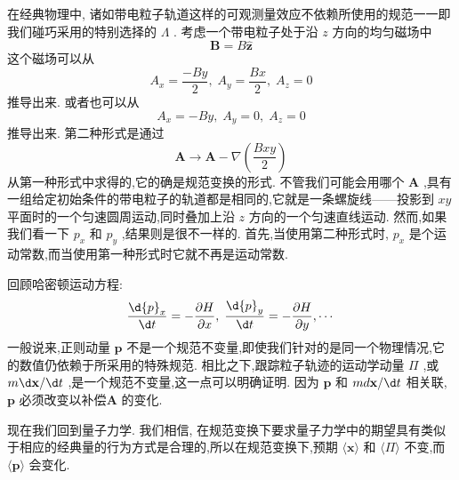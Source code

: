 在经典物理中, 诸如带电粒子轨道这样的可观测量效应不依赖所使用的规范一一即我们碰巧采用的特别选择的 $\Lambda$ . 考虑一个带电粒子处于沿 $z$ 方向的均匀磁场中
\begin{equation}
\mathbf{B} = B\widehat{\mathbf{z}}
\end{equation}
这个磁场可以从
\begin{equation}
{A}_{x} = \frac{-{By}}{2},\;{A}_{y} = \frac{Bx}{2},\;{A}_{z} = 0
\end{equation}
推导出来. 或者也可以从
\begin{equation}
{A}_{x} = - {By},\;{A}_{y} = 0,\;{A}_{z} = 0
\end{equation}
推导出来. 第二种形式是通过
\begin{equation}
\mathbf{A} \rightarrow \mathbf{A} - \nabla \left( \frac{Bxy}{2}\right)
\end{equation}
从第一种形式中求得的,它的确是规范变换的形式. 不管我们可能会用哪个 $\mathbf{A}$ ,具有一组给定初始条件的带电粒子的轨道都是相同的,它就是一条螺旋线——投影到 ${xy}$ 平面时的一个匀速圆周运动,同时叠加上沿 $z$ 方向的一个匀速直线运动. 然而,如果我们看一下 ${p}_{x}$ 和 ${p}_{y}$ ,结果则是很不一样的. 首先,当使用第二种形式时, ${p}_{x}$ 是个运动常数,而当使用第一种形式时它就不再是运动常数.

回顾哈密顿运动方程:
\begin{equation}
\frac{\d {p}_{x}}{\d t} = - \frac{\partial H}{\partial x},\;\frac{\d {p}_{y}}{\d t} = - \frac{\partial H}{\partial y},\cdots
\end{equation}
一般说来,正则动量 $\mathbf{p}$ 不是一个规范不变量,即使我们针对的是同一个物理情况,它的数值仍依赖于所采用的特殊规范. 相比之下,跟踪粒子轨迹的运动学动量 $\Pi$ ,或 ${m\d}\mathbf{x}/{\d t}$ ,是一个规范不变量,这一点可以明确证明. 因为 $\mathbf{p}$ 和 ${md}\mathbf{x}/{\d t}$ 相关联, $\mathbf{p}$ 必须改变以补偿$\mathbf{A}$ 的变化.

现在我们回到量子力学. 我们相信, 在规范变换下要求量子力学中的期望具有类似于相应的经典量的行为方式是合理的,所以在规范变换下,预期 $\langle \mathbf{x}\rangle$ 和 $\langle \Pi \rangle$ 不变,而 $\langle \mathbf{p}\rangle$ 会变化.


